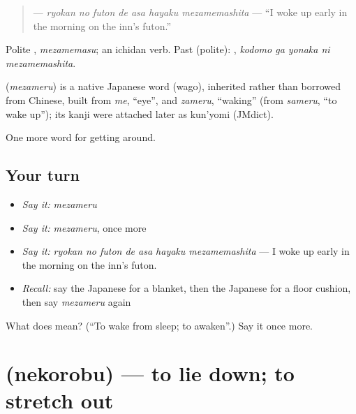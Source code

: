 \begin{quote}
\textbf{    } — \emph{ryokan no futon de asa hayaku mezamemashita} — \textquotedblleft{}I woke up early in the morning on the inn's futon.\textquotedblright{}
\end{quote}

Polite \textbf{}, \emph{mezamemasu}; an ichidan verb. Past (polite): \textbf{  }, \emph{kodomo ga yonaka ni mezamemashita}.

\begin{cousinweb}
\textbf{} (\emph{mezameru}) is a native Japanese word (wago), inherited rather than borrowed from Chinese, built from \emph{me}, \textquotedblleft{}eye\textquotedblright{}, and \emph{zameru}, \textquotedblleft{}waking\textquotedblright{} (from \emph{sameru}, \textquotedblleft{}to wake up\textquotedblright{}); its kanji were attached later as kun'yomi (JMdict).
\end{cousinweb}

\begin{grammarlens}[title={What you've built}]
One more word for getting around.
\end{grammarlens}

\subsection*{Your turn}
\begin{itemize}
\raggedright
  \item \emph{Say it:} \emph{mezameru}
  \item \emph{Say it:} \emph{mezameru}, once more
  \item \emph{Say it:} \emph{ryokan no futon de asa hayaku mezamemashita} — I woke up early in the morning on the inn's futon.
  \item \emph{Recall:} say the Japanese for a blanket, then the Japanese for a floor cushion, then say \emph{mezameru} again
\end{itemize}

\begin{tcolorbox}[breakable,colback=teal!4,colframe=teal!35!black,title={Before you move on}]
What does  mean? (\textquotedblleft{}To wake from sleep; to awaken\textquotedblright{}.) Say it once more.
\end{tcolorbox}
\section[\texorpdfstring{\ja{ねころぶ} (nekorobu)}{ねころぶ (nekorobu)}]{ (nekorobu) — to lie down; to stretch out}

